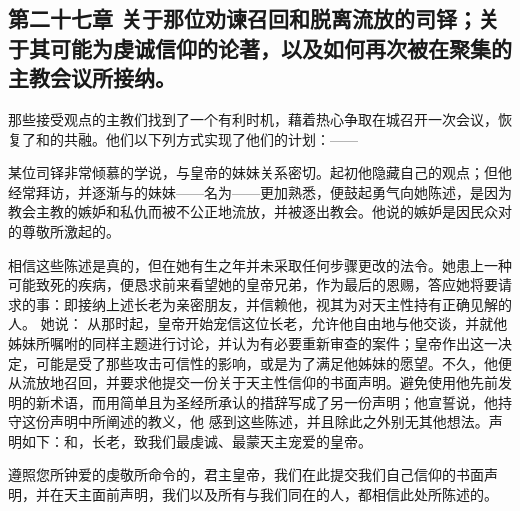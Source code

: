 
\subsection{第二十七章 关于那位劝谏召回和脱离流放的司铎；关于其可能为虔诚信仰的论著，以及如何再次被在聚集的主教会议所接纳。}

那些接受观点的主教们找到了一个有利时机，藉着热心争取在城召开一次会议，恢复了和的共融。他们以下列方式实现了他们的计划：——\par

某位司铎非常倾慕的学说，与皇帝的妹妹关系密切。起初他隐藏自己的观点；但他经常拜访，并逐渐与的妹妹——名为——更加熟悉，便鼓起勇气向她陈述，是因为教会主教的嫉妒和私仇而被不公正地流放，并被逐出教会。他说的嫉妒是因民众对的尊敬所激起的。\par

相信这些陈述是真的，但在她有生之年并未采取任何步骤更改的法令。她患上一种可能致死的疾病，便恳求前来看望她的皇帝兄弟，作为最后的恩赐，答应她将要请求的事：即接纳上述长老为亲密朋友，并信赖他，视其为对天主性持有正确见解的人。\newline{} 她说： 从那时起，皇帝开始宠信这位长老，允许他自由地与他交谈，并就他姊妹所嘱咐的同样主题进行讨论，并认为有必要重新审查的案件；皇帝作出这一决定，可能是受了那些攻击可信性的影响，或是为了满足他姊妹的愿望。不久，他便从流放地召回，并要求他提交一份关于天主性信仰的书面声明。避免使用他先前发明的新术语，而用简单且为圣经所承认的措辞写成了另一份声明；他宣誓说，他持守这份声明中所阐述的教义，他  感到这些陈述，并且除此之外别无其他想法。声明如下：和，长老，致我们最虔诚、最蒙天主宠爱的皇帝。\par

遵照您所钟爱的虔敬所命令的，君主皇帝，我们在此提交我们自己信仰的书面声明，并在天主面前声明，我们以及所有与我们同在的人，都相信此处所陈述的。\par

